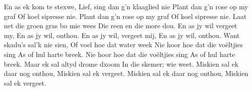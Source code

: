 \beginverse*
En as ek kom te stexwe,
Lief, sing dan g'n klaaglied nie
Plant dan g'n rose op my graf
Of koel sipresse nie.
Plant dan g'n rose op my graf
Of koel sipresse nie.
\endverse
\beginverse*
Laat net die groen gras bo mie wees
Die reen en die more dou.
En as jy wil vergeet my,
En as jy wil, onthou.
En as jy wil, vergeet mij,
En as jy wil, onthou.
\endverse
\beginverse*
Want skadu's sal'k nie sien,
Of voel hoe dat water week
Nie hoor hoe dat die voëltjies sing
As of hul harte breek.
Nie hoor hoe dat die voëltjies sing
As of hul harte breek.
\endverse
\beginverse*
Maar ek sal altyd drome dxoom
In die skemer; wie weet.
Miskien sal ek daar nog onthou,
Miskien sal ek vergeet.
Miskien sal ek daar nog onthou,
Miskien sal ek vergeet.
\endverse
\endsong